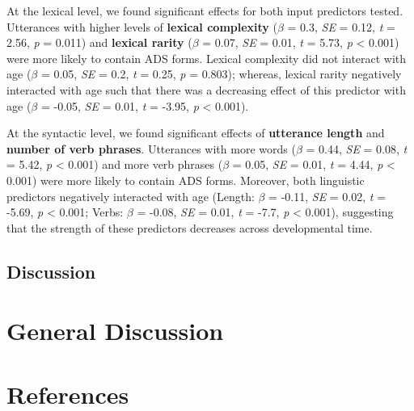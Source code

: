 \documentclass[10pt, letterpaper]{article}
\begin{document}
At the lexical level, we found significant effects for both input
predictors tested. Utterances with higher levels of \textbf{lexical
complexity} (\(\beta\) = 0.3, \emph{SE} = 0.12, \emph{t} = 2.56,
\emph{p} = 0.011) and \textbf{lexical rarity} (\(\beta\) = 0.07,
\emph{SE} = 0.01, \emph{t} = 5.73, \emph{p} \textless{} 0.001) were more
likely to contain ADS forms. Lexical complexity did not interact with
age (\(\beta\) = 0.05, \emph{SE} = 0.2, \emph{t} = 0.25, \emph{p} =
0.803); whereas, lexical rarity negatively interacted with age such that
there was a decreasing effect of this predictor with age (\(\beta\) =
-0.05, \emph{SE} = 0.01, \emph{t} = -3.95, \emph{p} \textless{} 0.001).

At the syntactic level, we found significant effects of
\textbf{utterance length} and \textbf{number of verb phrases}.
Utterances with more words (\(\beta\) = 0.44, \emph{SE} = 0.08, \emph{t}
= 5.42, \emph{p} \textless{} 0.001) and more verb phrases (\(\beta\) =
0.05, \emph{SE} = 0.01, \emph{t} = 4.44, \emph{p} \textless{} 0.001)
were more likely to contain ADS forms. Moreover, both linguistic
predictors negatively interacted with age (Length: \(\beta\) = -0.11,
\emph{SE} = 0.02, \emph{t} = -5.69, \emph{p} \textless{} 0.001; Verbs:
\(\beta\) = -0.08, \emph{SE} = 0.01, \emph{t} = -7.7, \emph{p}
\textless{} 0.001), suggesting that the strength of these predictors
decreases across developmental time.

\hypertarget{discussion}{%
\subsection{Discussion}\label{discussion}}

\hypertarget{general-discussion}{%
\section{General Discussion}\label{general-discussion}}

\hypertarget{references}{%
\section{References}\label{references}}

\setlength{\parindent}{-0.1in} 
\setlength{\leftskip}{0.125in}

\noindent
\end{document}
